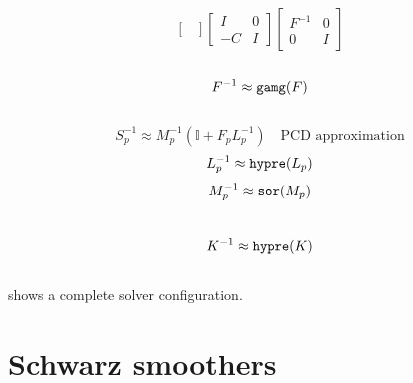 \documentclass[presentation,aspectratio=43]{beamer}
\begin{document}
\begin{frame}[fragile,t]
\begin{columns}[t]
\begin{column}{0.49\textwidth}
{\begin{equation*}
\begin{bmatrix}
          \end{bmatrix}
          \begin{bmatrix}
            I & 0\\
            -C & I
          \end{bmatrix}
          \begin{bmatrix}
            F^{-1} & 0 \\
            0 & I
          \end{bmatrix}
        \end{equation*}
        \\[0.5\baselineskip]
        \begin{equation*}
          F^{-1} \approx \text{\texttt{gamg}}(F)
        \end{equation*}
        \\[1.25\baselineskip]
        \begin{equation*}
          S_p^{-1} \approx M_p^{-1}(\mathbb{I} + F_p L_p^{-1})\quad\text{PCD approximation}
        \end{equation*}
        \vspace{-1\baselineskip}
        \begin{equation*}
          L_p^{-1} \approx \text{\texttt{hypre}}(L_p)
        \end{equation*}
        \vspace{-1\baselineskip}
        \begin{equation*}
          M_p^{-1} \approx \text{\texttt{sor}}(M_p)
        \end{equation*}
        \\[0.4\baselineskip]
        \begin{equation*}
          K^{-1} \approx \text{\texttt{hypre}}(K)
        \end{equation*}
      }
    \end{column}
  \end{columns}
  \vspace{-\baselineskip}
  {\scriptsize \textcite[\S B.4]{Kirby:2018} shows a complete solver configuration.}
\end{frame}

\section{Schwarz smoothers}
\end{document}
